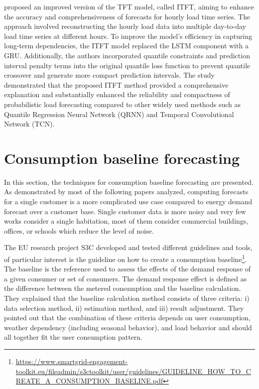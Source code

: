 \cite{LI2023108743} proposed an improved version of the TFT model, called ITFT, aiming to enhance the accuracy and comprehensiveness of forecasts for hourly load time series.
The approach involved reconstructing the hourly load data into multiple day-to-day load time series at different hours.
To improve the model's efficiency in capturing long-term dependencies, the ITFT model replaced the LSTM component with a GRU.
Additionally, the authors incorporated quantile constraints and prediction interval penalty terms into the original quantile loss function to prevent quantile crossover and generate more compact prediction intervals.
The study demonstrated that the proposed ITFT method provided a comprehensive explanation and substantially enhanced the reliability and compactness of probabilistic load forecasting compared to other widely used methods such as Quantile Regression Neural Network (QRNN) and Temporal Convolutional Network (TCN).


\section{Consumption baseline forecasting}
\label{sec:baselinesoa}
\vspace{0.2 cm}

In this section, the techniques for consumption baseline forecasting are presented.
As demonstrated by most of the following papers analyzed, computing forecasts for a single customer is a more complicated use case compared to energy demand forecast over a customer base.
Single customer data is more noisy and very few works consider a single habitation, most of them consider commercial buildings, offices, or schools which reduce the level of noise.

The EU research project S3C developed and tested different guidelines and tools, of particular interest is the guideline on how to create a consumption baseline\footnote{ \url{https://www.smartgrid-engagement-toolkit.eu/fileadmin/s3ctoolkit/user/guidelines/GUIDELINE_HOW_TO_CREATE_A_CONSUMPTION_BASELINE.pdf} }.
The baseline is the reference used to assess the effects of the demand response of a given consumer or set of consumers.
The demand response effect is defined as the difference between the metered consumption and the baseline calculation.
They explained that the baseline calculation method consists of three criteria:
i) data selection method,
ii) estimation method,
and iii) result adjustment.
They pointed out that the combination of these criteria depends on user consumption, weather dependency (including seasonal behavior), and load behavior and should all together fit the user consumption pattern.

